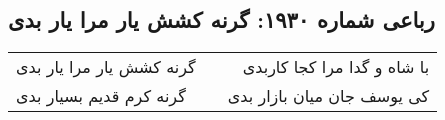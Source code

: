 \begin{center}
\section*{رباعی شماره ۱۹۳۰: گرنه کشش یار مرا یار بدی}
\label{sec:1930}
\begin{longtable}{l p{0.5cm} r}
گرنه کشش یار مرا یار بدی
&&
با شاه و گدا مرا کجا کاربدی
\\
گرنه کرم قدیم بسیار بدی
&&
کی یوسف جان میان بازار بدی
\\
\end{longtable}
\end{center}
